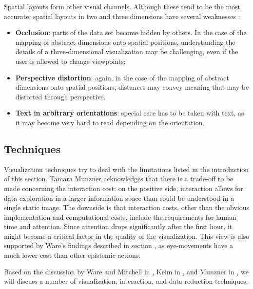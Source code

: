 Spatial layouts form other visual channels. Although these tend to be the most accurate, spatial layouts in two and three dimensions have several weaknesses \cite{shirley:2009}:

\begin{itemize}
	\item \textbf{Occlusion}: parts of the data set become hidden by others. In the case of the mapping of abstract dimensions onto spatial positions, understanding the details of a three-dimensional visualization may be challenging, even if the user is allowed to change viewpoints;
	\item \textbf{Perspective distortion}: again, in the case of the mapping of abstract dimensions onto spatial positions, distances may convey meaning that may be distorted through perspective.
	\item \textbf{Text in arbitrary orientations}: special care has to be taken with text, as it may become very hard to read depending on the orientation.
\end{itemize}


\subsection{Techniques}\label{chapter:literature_study:section:interaction:subsection:techniques}

Visualization techniques try to deal with the limitations listed in the introduction of this section. Tamara Munzner \cite{shirley:2009} acknowledges that there is a trade-off to be made concerning the interaction cost: on the positive side, interaction allows for data exploration in a larger information space than could be understood in a single static image. The downside is that interaction costs, other than the obvious implementation and computational costs, include the requirements for human time and attention\cite{shirley:2009}. Since attention drops significantly after the first hour\cite{ware:2004}, it might become a critical factor in the quality of the visualization. This view is also supported by Ware's findings described in section \cite{chapter:literature_study:section:user:subsection:interactive:subsubsection:loops3}, as eye-movements have a much lower cost than other epistemic actions\cite{ware:2004, ware:2008}.

Based on the discussion by Ware and Mitchell in \cite{ware:2004}, Keim in \cite{keim:2002}, and Munzner in \cite{shirley:2009}, we will discuss a number of visualization, interaction, and data reduction techniques.

